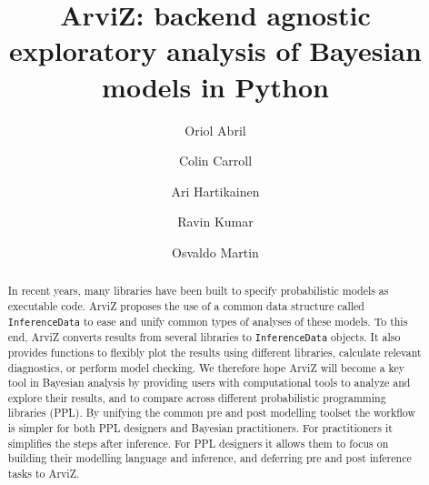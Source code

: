 \documentclass[anonymous=false, %
               format=acmsmall, %
               review=true, %
               screen=true, %
               nonacm=true]{acmart}
\begin{document}
\title{{ArviZ}: backend agnostic exploratory analysis of
{Bayesian} models in {Python}}

\author{Oriol Abril}
\affiliation{%
}

\author{Colin Carroll}

\author{Ari Hartikainen}

\author{Ravin Kumar}
\affiliation{%
}

\author{Osvaldo Martin}

\begin{abstract}
  In recent years, many libraries have been built to specify probabilistic models
  as executable code. ArviZ proposes the use of a common data structure called
  \texttt{InferenceData} to ease and unify common types of analyses of these models.
  To this end, ArviZ converts results from several libraries to
  \texttt{InferenceData} objects. It also provides functions to flexibly plot the
  results using different
  libraries, calculate relevant diagnostics, or perform model checking.
  We therefore hope ArviZ will become a key tool in Bayesian analysis by
  providing users with computational tools to analyze and explore their results, and to
  compare across different probabilistic programming libraries (PPL).
  By unifying the common pre and post modelling toolset the workflow is simpler
  for both PPL designers and Bayesian practitioners. For practitioners it
  simplifies the steps after inference. For PPL designers it allows them to
  focus on building their modelling language and inference, and deferring
  pre and post inference tasks to ArviZ.
\end{abstract}
\end{document}
